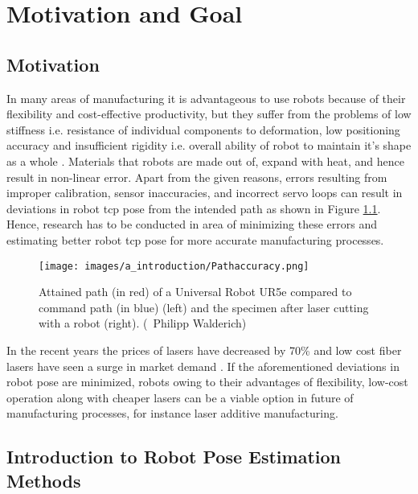 \chapter{Motivation and Goal}\label{chap:motivation_and_goal}

\section*{Motivation}
    In many areas of manufacturing it is advantageous to use robots because of their flexibility and cost-effective productivity, but they suffer from the problems of low stiffness i.e. resistance of individual components to deformation, low positioning accuracy and insufficient rigidity i.e. overall ability of robot to maintain it's shape as a whole \cite{ji, chen}. Materials that robots are made out of, expand with heat, and hence result in non-linear error. Apart from the given reasons, errors resulting from improper calibration, sensor inaccuracies, and incorrect servo loops \cite{greenway, torgny} can result in deviations in robot \Gls{tcp} pose from the intended path as shown in Figure \ref{fig:fig_walderich}. Hence, research has to be conducted in area of minimizing these errors and estimating better robot \Gls{tcp} pose for more accurate manufacturing processes.

        \begin{figure}[h]
            \centering
            \texttt{[image: images/a\_introduction/Pathaccuracy.png]}
            \caption{Attained path (in red) of a Universal Robot UR5e compared to command path (in blue) (left) and the specimen after laser cutting with a robot (right). (\textcopyright \ Philipp Walderich) \cite{img_walderich}}
            \label{fig:fig_walderich}
        \end{figure}

        \noindent In the recent years the prices of lasers have decreased by 70\% and low cost fiber lasers have seen a surge in market demand \cite{optech}. If the aforementioned deviations in robot pose are minimized, robots owing to their advantages of flexibility, low-cost operation along with cheaper lasers can be a viable option in future of manufacturing processes, for instance laser additive manufacturing.
    

\section*{Introduction to Robot Pose Estimation Methods}

